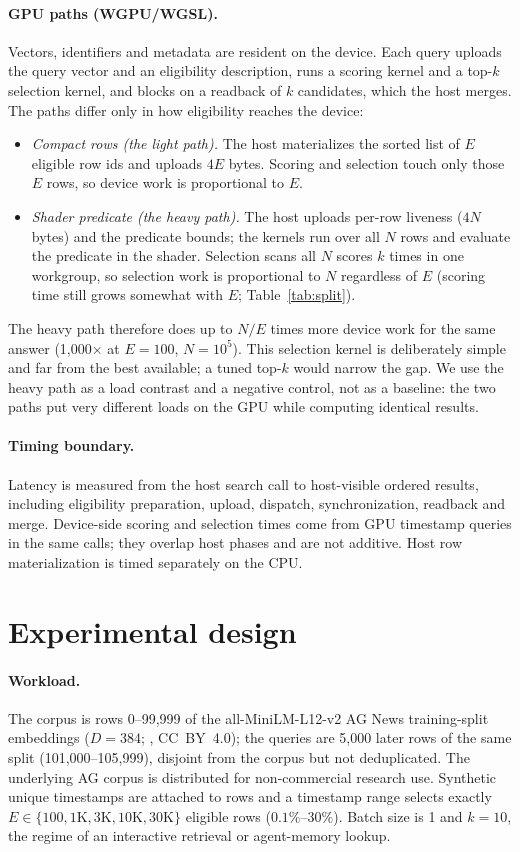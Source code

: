 \paragraph{GPU paths (WGPU/WGSL).} Vectors, identifiers and metadata are resident on the device. Each query uploads the query vector and an eligibility description, runs a scoring kernel and a top-$k$ selection kernel, and blocks on a readback of $k$ candidates, which the host merges. The paths differ only in how eligibility reaches the device:
\begin{itemize}
\item \emph{Compact rows (the light path).} The host materializes the sorted list of $E$ eligible row ids and uploads $4E$ bytes. Scoring and selection touch only those $E$ rows, so device work is proportional to $E$.
\item \emph{Shader predicate (the heavy path).} The host uploads per-row liveness ($4N$ bytes) and the predicate bounds; the kernels run over all $N$ rows and evaluate the predicate in the shader. Selection scans all $N$ scores $k$ times in one workgroup, so selection work is proportional to $N$ regardless of $E$ (scoring time still grows somewhat with $E$; Table~\ref{tab:split}).
\end{itemize}
The heavy path therefore does up to $N/E$ times more device work for the same answer (1{,}000$\times$ at $E=100$, $N=10^5$). This selection kernel is deliberately simple and far from the best available; a tuned top-$k$ would narrow the gap. We use the heavy path as a load contrast and a negative control, not as a baseline: the two paths put very different loads on the GPU while computing identical results.

\paragraph{Timing boundary.} Latency is measured from the host search call to host-visible ordered results, including eligibility preparation, upload, dispatch, synchronization, readback and merge. Device-side scoring and selection times come from GPU timestamp queries in the same calls; they overlap host phases and are not additive. Host row materialization is timed separately on the CPU.

\section{Experimental design}\label{sec:setup}
\paragraph{Workload.} The corpus is rows 0--99,999 of the all-MiniLM-L12-v2 AG News training-split embeddings ($D=384$; \citealp{nielsen2022agnews}, CC~BY~4.0); the queries are 5{,}000 later rows of the same split (101,000--105,999), disjoint from the corpus but not deduplicated. The underlying AG corpus is distributed for non-commercial research use. Synthetic unique timestamps are attached to rows and a timestamp range selects exactly $E\in\{100, 1\text{K}, 3\text{K}, 10\text{K}, 30\text{K}\}$ eligible rows ($0.1\%$--$30\%$). Batch size is 1 and $k=10$, the regime of an interactive retrieval or agent-memory lookup.

